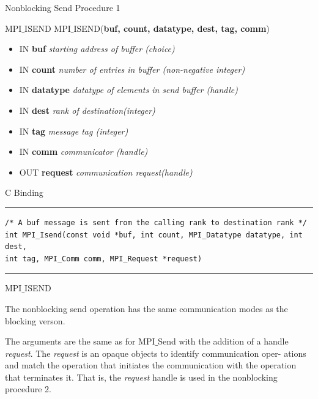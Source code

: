 \documentclass[xcolor=dvipsnames]{beamer}
\begin{document}
\begin{frame}[fragile]{Nonblocking Send Procedure 1}
\begin{block}{MPI$\_$ISEND}
MPI$\_$ISEND(\textbf{buf, count, datatype, dest, tag, comm})
\\
\begin{itemize}
\item[] IN \textbf{buf} \: \textit{starting address of buffer (choice)}\\
\item[] IN \textbf{count} \: \textit{number of entries in buffer (non-negative integer)}\\
\item[] IN \textbf{datatype} \: \textit{datatype of elements in send buffer (handle)}\\
\item[] IN \textbf{dest} \: \textit{rank of destination(integer)}\\
\item[] IN \textbf{tag} \: \textit{message tag (integer)}\\
\item[] IN \textbf{comm} \: \textit{communicator (handle)}\\
\item[] OUT \textbf{request} \: \textit{communication request(handle)}
\end{itemize}
\end{block}

C Binding
\rule{\textwidth}{1pt}
\scriptsize
\begin{verbatim}
/* A buf message is sent from the calling rank to destination rank */
int MPI_Isend(const void *buf, int count, MPI_Datatype datatype, int dest,
int tag, MPI_Comm comm, MPI_Request *request)
\end{verbatim}
\rule{\textwidth}{1pt}
\end{frame}


\begin{frame}{MPI$\_$ISEND}
\begin{outline}
\1 The nonblocking send operation has the same communication modes as the blocking verson.

\1 The arguments
are the same as for MPI$\_$Send with the addition of a handle \textit{request}.
\2 The \textit{request} is an opaque objects to identify communication oper-
ations and match the operation that initiates the communication with the operation that
terminates it.
\2 That is, the \textit{request} handle is used in the nonblocking procedure 2.
\end{outline}
\end{frame}
\end{document}
